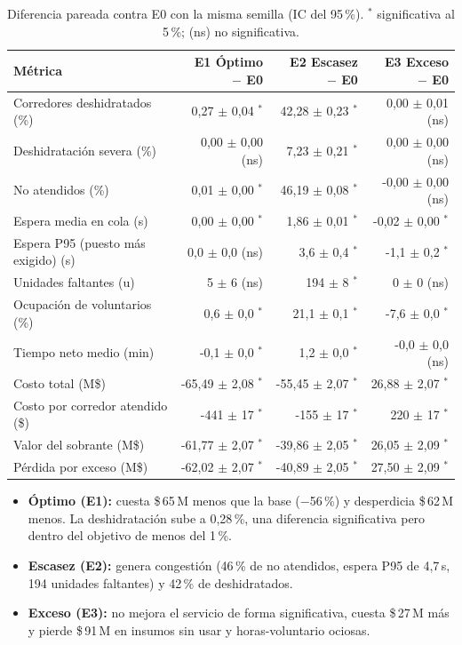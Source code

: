 \documentclass[11pt,a4paper]{article}
\begin{document}
\begin{table}[H]
\centering
\small
\begin{tabular}{lrrr}
\toprule
\textbf{Métrica} & \textbf{E1 Óptimo $-$ E0} & \textbf{E2 Escasez $-$ E0} & \textbf{E3 Exceso $-$ E0} \\
\midrule
Corredores deshidratados (\%) & 0,27 $\pm$ 0,04 $^{*}$ & 42,28 $\pm$ 0,23 $^{*}$ & 0,00 $\pm$ 0,01 (ns) \\
Deshidratación severa (\%) & 0,00 $\pm$ 0,00 (ns) & 7,23 $\pm$ 0,21 $^{*}$ & 0,00 $\pm$ 0,00 (ns) \\
No atendidos (\%) & 0,01 $\pm$ 0,00 $^{*}$ & 46,19 $\pm$ 0,08 $^{*}$ & -0,00 $\pm$ 0,00 (ns) \\
Espera media en cola (s) & 0,00 $\pm$ 0,00 $^{*}$ & 1,86 $\pm$ 0,01 $^{*}$ & -0,02 $\pm$ 0,00 $^{*}$ \\
Espera P95 (puesto más exigido) (s) & 0,0 $\pm$ 0,0 (ns) & 3,6 $\pm$ 0,4 $^{*}$ & -1,1 $\pm$ 0,2 $^{*}$ \\
Unidades faltantes (u) & 5 $\pm$ 6 (ns) & 194 $\pm$ 8 $^{*}$ & 0 $\pm$ 0 (ns) \\
Ocupación de voluntarios (\%) & 0,6 $\pm$ 0,0 $^{*}$ & 21,1 $\pm$ 0,1 $^{*}$ & -7,6 $\pm$ 0,0 $^{*}$ \\
Tiempo neto medio (min) & -0,1 $\pm$ 0,0 $^{*}$ & 1,2 $\pm$ 0,0 $^{*}$ & -0,0 $\pm$ 0,0 (ns) \\
Costo total (M\$) & -65,49 $\pm$ 2,08 $^{*}$ & -55,45 $\pm$ 2,07 $^{*}$ & 26,88 $\pm$ 2,07 $^{*}$ \\
Costo por corredor atendido (\$) & -441 $\pm$ 17 $^{*}$ & -155 $\pm$ 17 $^{*}$ & 220 $\pm$ 17 $^{*}$ \\
Valor del sobrante (M\$) & -61,77 $\pm$ 2,07 $^{*}$ & -39,86 $\pm$ 2,05 $^{*}$ & 26,05 $\pm$ 2,09 $^{*}$ \\
Pérdida por exceso (M\$) & -62,02 $\pm$ 2,07 $^{*}$ & -40,89 $\pm$ 2,05 $^{*}$ & 27,50 $\pm$ 2,09 $^{*}$ \\
\bottomrule
\end{tabular}
\caption{Diferencia pareada contra E0 con la misma semilla (IC del 95\,\%). $^{*}$ significativa al 5\,\%; (ns) no significativa.}
\label{tab:diferencias}
\end{table}

\begin{itemize}
    \item \textbf{Óptimo (E1):} cuesta \$\,65\,M menos que la base ($-$56\,\%) y desperdicia \$\,62\,M menos. La deshidratación sube a 0,28\,\%, una diferencia significativa pero dentro del objetivo de menos del 1\,\%.
    \item \textbf{Escasez (E2):} genera congestión (46\,\% de no atendidos, espera P95 de 4,7\,s, 194 unidades faltantes) y 42\,\% de deshidratados.
    \item \textbf{Exceso (E3):} no mejora el servicio de forma significativa, cuesta \$\,27\,M más y pierde \$\,91\,M en insumos sin usar y horas-voluntario ociosas.
\end{itemize}
\end{document}
